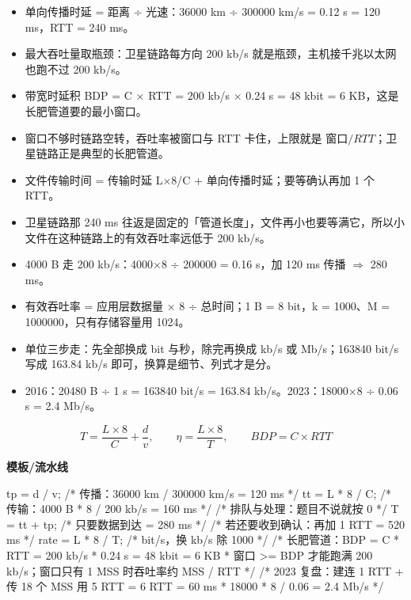 \documentclass[10pt,a4paper]{ctexart}
\begin{document}
\begin{itemize}

\item 单向传播时延 = 距离 ÷ 光速：36000 km ÷ 300000 km/s = 0.12 s = 120 ms，RTT = 240 ms。

\item 最大吞吐量取瓶颈：卫星链路每方向 200 kb/s 就是瓶颈，主机接千兆以太网也跑不过 200 kb/s。

\item 带宽时延积 BDP = C × RTT = 200 kb/s × 0.24 s = 48 kbit = 6 KB，这是长肥管道要的最小窗口。

\item 窗口不够时链路空转，吞吐率被窗口与 RTT 卡住，上限就是 $窗口/RTT$；卫星链路正是典型的长肥管道。

\item 文件传输时间 = 传输时延 L×8/C + 单向传播时延；要等确认再加 1 个 RTT。

\item 卫星链路那 240 ms 往返是固定的「管道长度」，文件再小也要等满它，所以小文件在这种链路上的有效吞吐率远低于 200 kb/s。

\item 4000 B 走 200 kb/s：4000×8 ÷ 200000 = 0.16 s，加 120 ms 传播 $\Rightarrow$ 280 ms。

\item 有效吞吐率 = 应用层数据量 × 8 ÷ 总时间；1 B = 8 bit，k = 1000、M = 1000000，只有存储容量用 1024。

\item 单位三步走：先全部换成 bit 与秒，除完再换成 kb/s 或 Mb/s；163840 bit/s 写成 163.84 kb/s 即可，换算是细节、列式才是分。

\item 2016：20480 B ÷ 1 s = 163840 bit/s = 163.84 kb/s。2023：18000×8 ÷ 0.06 s = 2.4 Mb/s。

\end{itemize}

\[
T=\frac{L\times 8}{C}+\frac{d}{v},\qquad \eta=\frac{L\times 8}{T},\qquad BDP=C\times RTT
\]

\textbf{模板/流水线}

\begin{codebox}
tp = d / v;                  /* 传播：36000 km / 300000 km/s = 120 ms */
tt = L * 8 / C;              /* 传输：4000 B * 8 / 200 kb/s = 160 ms */
/* 排队与处理：题目不说就按 0 */
T  = tt + tp;                /* 只要数据到达 = 280 ms */
                             /* 若还要收到确认：再加 1 RTT = 520 ms */
rate = L * 8 / T;            /* bit/s，换 kb/s 除 1000 */
/* 长肥管道：BDP = C * RTT = 200 kb/s * 0.24 s = 48 kbit = 6 KB
 * 窗口 >= BDP 才能跑满 200 kb/s；窗口只有 1 MSS 时吞吐率约 MSS / RTT
 */
/* 2023 复盘：建连 1 RTT + 传 18 个 MSS 用 5 RTT = 6 RTT = 60 ms
 * 18000 * 8 / 0.06 = 2.4 Mb/s
 */
\end{codebox}
\end{document}
